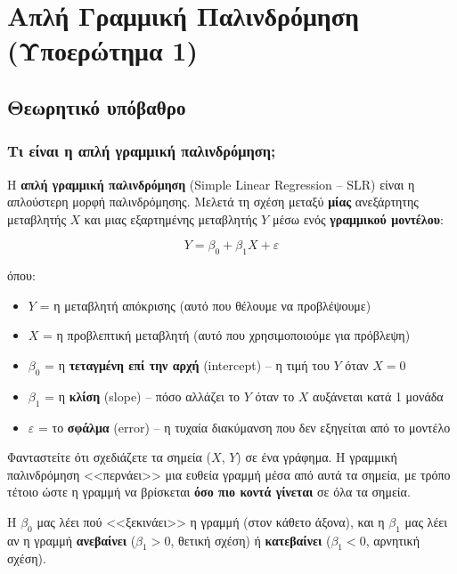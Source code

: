 \documentclass[12pt,a4paper]{article}
\begin{document}
\newpage
\section{Απλή Γραμμική Παλινδρόμηση (Υποερώτημα 1)}

\subsection{Θεωρητικό υπόβαθρο}

\subsubsection{Τι είναι η απλή γραμμική παλινδρόμηση;}

\begin{theorybox}
Η \textbf{απλή γραμμική παλινδρόμηση} (Simple Linear Regression -- SLR) είναι η απλούστερη μορφή παλινδρόμησης. Μελετά τη σχέση μεταξύ \textbf{μίας} ανεξάρτητης μεταβλητής $X$ και μιας εξαρτημένης μεταβλητής $Y$ μέσω ενός \textbf{γραμμικού μοντέλου}:

\begin{equation}
Y = \beta_0 + \beta_1 X + \varepsilon
\end{equation}

όπου:
\begin{itemize}
    \item $Y$ = η μεταβλητή απόκρισης (αυτό που θέλουμε να προβλέψουμε)
    \item $X$ = η προβλεπτική μεταβλητή (αυτό που χρησιμοποιούμε για πρόβλεψη)
    \item $\beta_0$ = η \textbf{τεταγμένη επί την αρχή} (intercept) -- η τιμή του $Y$ όταν $X = 0$
    \item $\beta_1$ = η \textbf{κλίση} (slope) -- πόσο αλλάζει το $Y$ όταν το $X$ αυξάνεται κατά 1 μονάδα
    \item $\varepsilon$ = το \textbf{σφάλμα} (error) -- η τυχαία διακύμανση που δεν εξηγείται από το μοντέλο
\end{itemize}
\end{theorybox}

\begin{examplebox}
Φανταστείτε ότι σχεδιάζετε τα σημεία ($X$, $Y$) σε ένα γράφημα. Η γραμμική παλινδρόμηση <<περνάει>> μια ευθεία γραμμή μέσα από αυτά τα σημεία, με τρόπο τέτοιο ώστε η γραμμή να βρίσκεται \textbf{όσο πιο κοντά γίνεται} σε όλα τα σημεία.

Η $\beta_0$ μας λέει πού <<ξεκινάει>> η γραμμή (στον κάθετο άξονα), και η $\beta_1$ μας λέει αν η γραμμή \textbf{ανεβαίνει} ($\beta_1 > 0$, θετική σχέση) ή \textbf{κατεβαίνει} ($\beta_1 < 0$, αρνητική σχέση).
\end{examplebox}
\end{document}
